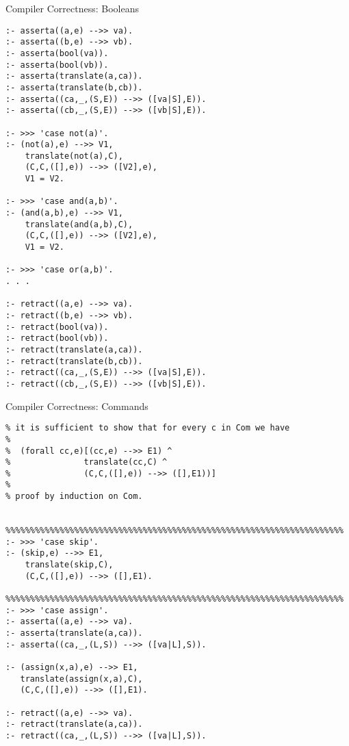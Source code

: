 \documentclass{beamer}
\begin{document}
\begin{frame}[fragile]{Compiler Correctness: Booleans}

\tiny
\begin{verbatim}
:- asserta((a,e) -->> va).
:- asserta((b,e) -->> vb).
:- asserta(bool(va)).
:- asserta(bool(vb)).
:- asserta(translate(a,ca)).
:- asserta(translate(b,cb)).
:- asserta((ca,_,(S,E)) -->> ([va|S],E)).
:- asserta((cb,_,(S,E)) -->> ([vb|S],E)).

:- >>> 'case not(a)'.
:- (not(a),e) -->> V1,
    translate(not(a),C),
    (C,C,([],e)) -->> ([V2],e),
    V1 = V2.

:- >>> 'case and(a,b)'.
:- (and(a,b),e) -->> V1,
    translate(and(a,b),C),
    (C,C,([],e)) -->> ([V2],e),
    V1 = V2.

:- >>> 'case or(a,b)'.
. . .

:- retract((a,e) -->> va).
:- retract((b,e) -->> vb).
:- retract(bool(va)).
:- retract(bool(vb)).
:- retract(translate(a,ca)).
:- retract(translate(b,cb)).
:- retract((ca,_,(S,E)) -->> ([va|S],E)).
:- retract((cb,_,(S,E)) -->> ([vb|S],E)).
\end{verbatim}
\end{frame}

\begin{frame}[fragile]{Compiler Correctness: Commands}

\tiny
\begin{verbatim}
% it is sufficient to show that for every c in Com we have
%
%  (forall cc,e)[(cc,e) -->> E1) ^
%               translate(cc,C) ^
%               (C,C,([],e)) -->> ([],E1))]
%
% proof by induction on Com.


%%%%%%%%%%%%%%%%%%%%%%%%%%%%%%%%%%%%%%%%%%%%%%%%%%%%%%%%%%%%%%%%%%%%%
:- >>> 'case skip'.
:- (skip,e) -->> E1,
    translate(skip,C),
    (C,C,([],e)) -->> ([],E1).

%%%%%%%%%%%%%%%%%%%%%%%%%%%%%%%%%%%%%%%%%%%%%%%%%%%%%%%%%%%%%%%%%%%%%
:- >>> 'case assign'.
:- asserta((a,e) -->> va).
:- asserta(translate(a,ca)).
:- asserta((ca,_,(L,S)) -->> ([va|L],S)).

:- (assign(x,a),e) -->> E1,
   translate(assign(x,a),C),
   (C,C,([],e)) -->> ([],E1).

:- retract((a,e) -->> va).
:- retract(translate(a,ca)).
:- retract((ca,_,(L,S)) -->> ([va|L],S)).
\end{verbatim}
\end{frame}
\end{document}
